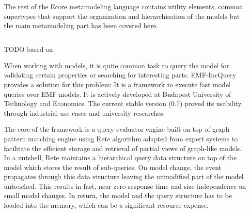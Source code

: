 The rest of the Ecore metamodeling language contains utility elements,
common supertypes that support the organization and hierarchisation of the
models but the main metamodeling part has been covered here.


\subsection{\eiq{}}
\label{subsec:eiq}

TODO based on \cite{CsikosMasters}





When working with models, it is quite common task to query the model for
validating certain properties or searching for interesting parts. EMF-IncQuery
\cite{EMFIncQuery} provides a solution for this problem: It is a framework to
execute fast model queries over EMF models. It is actively developed at Budapest
University of Technology and Economics. The current stable version (0.7) 
proved its usability through industrial use-cases
and university researches.

The core of the framework is a query evaluator engine built on top of graph
pattern matching engine using Rete algorithm adapted from expert
systems to facilitate the efficient storage and retrieval of partial views of
graph-like models. In a nutshell, Rete maintains a hierarchical query data
structure on top of the model which stores the result of sub-queries. On model
change, the event propagates through this data structure leaving the unmodified
part of the model untouched. This results in fast, near zero response time and
size-independence on small model changes. In return, the model and the query
structure has to be loaded into the memory, which can be a significant resource
expense.

